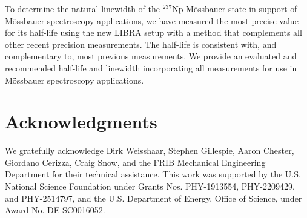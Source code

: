 \documentclass[aps,UTF8,prc,twocolumn,preprintnumbers,amsmath,amssymb,floatfix]{revtex4-2}
\begin{document}
To determine the natural linewidth of the $^{237}$Np M\"{o}ssbauer state in support of M\"{o}ssbauer spectroscopy applications, we have measured the most precise value for its half-life using the new LIBRA setup with a method that complements all other recent precision measurements. The half-life is consistent with, and complementary to, most previous measurements. We provide an evaluated and recommended half-life and linewidth incorporating all measurements for use in M\"{o}ssbauer spectroscopy applications. 

\section{Acknowledgments}
We gratefully acknowledge Dirk Weisshaar, Stephen Gillespie, Aaron Chester, Giordano Cerizza, Craig Snow, and the FRIB Mechanical Engineering Department for their technical assistance. This work was supported by the U.S. National Science Foundation under Grants Nos. PHY-1913554, PHY-2209429, and PHY-2514797, and the U.S. Department of Energy, Office of Science, under Award No. DE-SC0016052.
\end{document}
